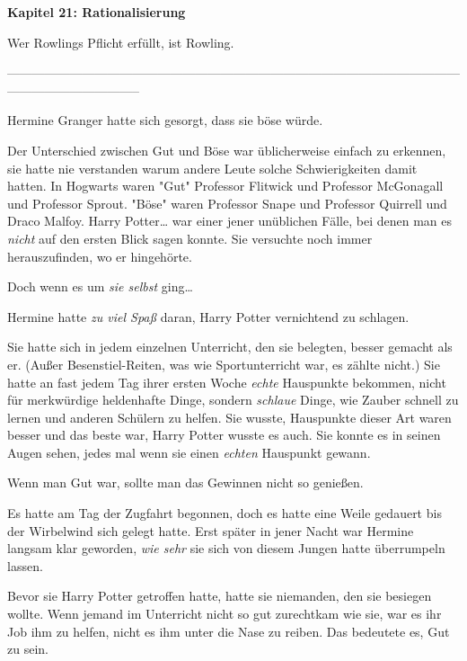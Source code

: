 

\hypertarget{rationalisierung}{%

\textbf{Kapitel 21: Rationalisierung\\ }

Wer Rowlings Pflicht erfüllt, ist Rowling.

--------------------------------------------------------------------------------------------------------------------------------------------

Hermine Granger hatte sich gesorgt, dass sie böse würde.

Der Unterschied zwischen Gut und Böse war üblicherweise einfach zu erkennen, sie hatte nie verstanden warum andere Leute solche Schwierigkeiten damit hatten. In Hogwarts waren "Gut" Professor Flitwick und Professor McGonagall und Professor Sprout. "Böse" waren Professor Snape und Professor Quirrell und Draco Malfoy. Harry Potter… war einer jener unüblichen Fälle, bei denen man es \emph{nicht} auf den ersten Blick sagen konnte. Sie versuchte noch immer herauszufinden, wo er hingehörte.

Doch wenn es um \emph{sie selbst} ging…

Hermine hatte \emph{zu viel Spaß} daran, Harry Potter vernichtend zu schlagen.

Sie hatte sich in jedem einzelnen Unterricht, den sie belegten, besser gemacht als er. (Außer Besenstiel-Reiten, was wie Sportunterricht war, es zählte nicht.) Sie hatte an fast jedem Tag ihrer ersten Woche \emph{echte} Hauspunkte bekommen, nicht für merkwürdige heldenhafte Dinge, sondern \emph{schlaue} Dinge, wie Zauber schnell zu lernen und anderen Schülern zu helfen. Sie wusste, Hauspunkte dieser Art waren besser und das beste war, Harry Potter wusste es auch. Sie konnte es in seinen Augen sehen, jedes mal wenn sie einen \emph{echten} Hauspunkt gewann.

Wenn man Gut war, sollte man das Gewinnen nicht so genießen.

Es hatte am Tag der Zugfahrt begonnen, doch es hatte eine Weile gedauert bis der Wirbelwind sich gelegt hatte. Erst später in jener Nacht war Hermine langsam klar geworden, \emph{wie sehr} sie sich von diesem Jungen hatte überrumpeln lassen.

Bevor sie Harry Potter getroffen hatte, hatte sie niemanden, den sie besiegen wollte. Wenn jemand im Unterricht nicht so gut zurechtkam wie sie, war es ihr Job ihm zu helfen, nicht es ihm unter die Nase zu reiben. Das bedeutete es, Gut zu sein.

}

